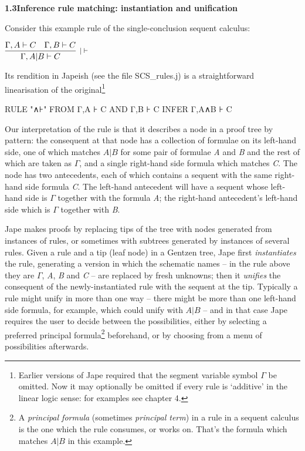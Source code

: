 \documentclass[11pt]{book}
\newcommand{\tab}{\hspace{5mm}}
\newcommand{\reason}[1]{\scalebox{0.85}{#1}}
\begin{document}
\textbf{{\large 1.3\tab Inference rule matching: instantiation and unification}}


Consider this example rule of the single-conclusion sequent calculus:


$\infer[\reason{$| |- $}]
       {\Gamma,A|B |- C}
       {\Gamma,A |- C\quad \Gamma,B |- C}$

Its rendition in Japeish (see the file SCS\_rules.j) is a straightforward linearisation of the original\footnote{Earlier versions of Jape required that the segment variable symbol \ensuremath{\Gamma} be omitted. Now it may optionally be omitted if every rule is `additive' in the linear logic sense: for examples see chapter 4.}

RULE "∧⊦" FROM Γ,A ⊦ C AND Γ,B ⊦ C INFER Γ,A∧B ⊦ C


Our interpretation of the rule is that it describes a node in a proof tree by pattern: the consequent at that node has a collection of formulae on its left-hand side, one of which matches $A|B$ for some pair of formulae \textit{A} and \textit{B} and the rest of which are taken as \ensuremath{\Gamma}, and a single right-hand side formula which matches \textit{C}. The node has two antecedents, each of which contains a sequent with the same right-hand side formula \textit{C}. The left-hand antecedent will have a sequent whose left-hand side is \ensuremath{\Gamma} together with the formula \textit{A}; the right-hand antecedent's left-hand side which is \ensuremath{\Gamma} together with \textit{B}.


Jape makes proofs by replacing tips of the tree with nodes generated from instances of rules, or sometimes with subtrees generated by instances of several rules. Given a rule and a tip (leaf node) in a Gentzen tree, Jape first \textit{instantiates} the rule, generating a version in which the schematic names -- in the rule above they are \ensuremath{\Gamma}, \textit{A}, \textit{B} and \textit{C} -- are replaced by fresh unknowns; then it \textit{unifies} the consequent of the newly-instantiated rule with the sequent at the tip. Typically a rule might unify in more than one way -- there might be more than one left-hand side formula, for example, which could unify with $A|B$ -- and in that case Jape requires the user to decide between the possibilities, either by selecting a preferred principal formula\footnote{A \textit{principal formula} (sometimes \textit{principal term}) in a rule in a sequent calculus is the one which the rule consumes, or works on. That's the formula which matches $A|B$ in this example.} beforehand, or by choosing from a menu of possibilities afterwards.
\end{document}

